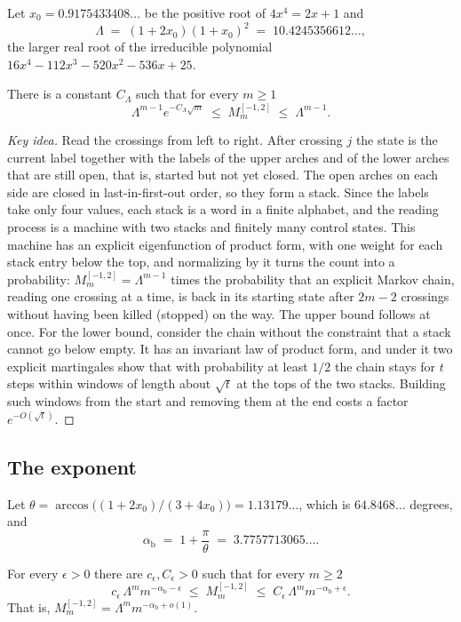 Let $x_0=0.9175433408\ldots$ be the positive root of $4x^4=2x+1$ and
\[ \Lambda\;=\;(1+2x_0)(1+x_0)^2\;=\;10.4245356612\ldots, \]
the larger real root of the irreducible polynomial $16x^4-112x^3-520x^2-536x+25$.

\begin{theorem}\label{thm:bandgrowth}
There is a constant $C_\Lambda$ such that for every $m\ge1$
\[ \Lambda^{m-1}e^{-C_\Lambda\sqrt m}\;\le\;M^{[-1,2]}_m\;\le\;\Lambda^{m-1}. \]
\end{theorem}

\begin{proof}[Key idea]
Read the crossings from left to right. After crossing $j$ the state is the current label together with
the labels of the upper arches and of the lower arches that are still open, that is, started but not
yet closed. The open arches on each side are closed in last-in-first-out order, so they form a stack.
Since the labels take only four values, each stack is a word in a finite alphabet, and the reading
process is a machine with two stacks and finitely many control states. This machine has an explicit
eigenfunction of product form, with one weight for each stack entry below the top, and
normalizing by it turns the count into a probability: $M^{[-1,2]}_m=\Lambda^{m-1}$ times the
probability that an explicit Markov chain, reading one crossing at a time, is back in its starting
state after $2m-2$ crossings without having been killed (stopped) on the way. The upper bound follows
at once. For the lower bound, consider the chain without the constraint that a stack cannot go below
empty. It has an invariant law of product form, and under it two explicit martingales show that with
probability at least $1/2$ the chain stays for $t$ steps within windows of length about $\sqrt t$ at
the tops of the two stacks. Building such windows from the start and removing them at the end costs a
factor $e^{-O(\sqrt t)}$.
\end{proof}

\subsection{The exponent}

Let $\theta=\arccos\big((1+2x_0)/(3+4x_0)\big)=1.13179\ldots$, which is $64.8468\ldots$ degrees, and
\[ \alpha_{\mathrm b}\;=\;1+\frac{\pi}{\theta}\;=\;3.7757713065\ldots . \]

\begin{theorem}[exponent]\label{thm:bandexp}
For every $\epsilon>0$ there are $c_\epsilon,C_\epsilon>0$ such that for every $m\ge2$
\[ c_\epsilon\,\Lambda^m m^{-\alpha_{\mathrm b}-\epsilon}\;\le\;M^{[-1,2]}_m\;\le\;C_\epsilon\,\Lambda^m m^{-\alpha_{\mathrm b}+\epsilon}. \]
That is, $M^{[-1,2]}_m=\Lambda^m m^{-\alpha_{\mathrm b}+o(1)}$.
\end{theorem}


